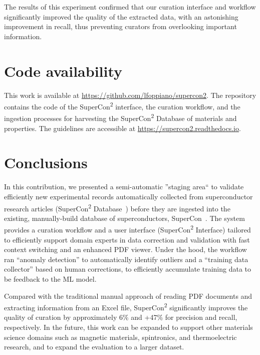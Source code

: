 The results of this experiment confirmed that our curation interface and workflow significantly improved the quality of the extracted data, with an astonishing improvement in recall, thus preventing curators from overlooking important information.

\section{Code availability}
This work is available at \url{https://github.com/lfoppiano/supercon2}. The repository contains the code of the SuperCon\textsuperscript{2} interface, the curation workflow, and the ingestion processes for harvesting the SuperCon\textsuperscript{2} Database of materials and properties. The guidelines are accessible at \url{https://supercon2.readthedocs.io}.


\section{Conclusions}

In this contribution, we presented a semi-automatic ''staging area`` to validate efficiently new experimental records automatically collected from superconductor research articles (SuperCon\textsuperscript{2} Database~\cite{foppiano2023automatic}) before they are ingested into the existing, manually-build database of superconductors, SuperCon~\cite{ishii2023structuring}.
The system provides a curation workflow and a user interface (SuperCon\textsuperscript{2} Interface) tailored to efficiently support domain experts in data correction and validation with fast context switching and an enhanced PDF viewer.
Under the hood, the workflow ran ``anomaly detection'' to automatically identify outliers and a ``training data collector'' based on human corrections, to efficiently accumulate training data to be feedback to the ML model. 

Compared with the traditional manual approach of reading PDF documents and extracting information from an Excel file, SuperCon\textsuperscript{2} significantly improves the quality of curation by approximately 6\% and +47\% for precision and recall, respectively.
In the future, this work can be expanded to support other materials science domains such as magnetic materials, spintronics, and thermoelectric research, and to expand the evaluation to a larger dataset. 
